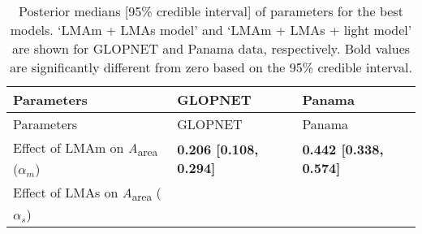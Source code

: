 \documentclass[
  12pt,
]{article}
\begin{document}
\newpage

\hypertarget{section-1}{%
\section{}\label{section-1}}

\begin{longtable}[]{@{}lll@{}}
\caption{\label{tab:paratab} Posterior medians {[}95\% credible interval{]} of parameters for the best models. `LMAm + LMAs model' and `LMAm + LMAs + light model' are shown for GLOPNET and Panama data, respectively. Bold values are significantly different from zero based on the 95\% credible interval.}\tabularnewline
\toprule
\begin{minipage}[b]{0.39\columnwidth}\raggedright
Parameters\strut
\end{minipage} & \begin{minipage}[b]{0.26\columnwidth}\raggedright
GLOPNET\strut
\end{minipage} & \begin{minipage}[b]{0.26\columnwidth}\raggedright
Panama\strut
\end{minipage}\tabularnewline
\midrule
\endfirsthead
\toprule
\begin{minipage}[b]{0.39\columnwidth}\raggedright
Parameters\strut
\end{minipage} & \begin{minipage}[b]{0.26\columnwidth}\raggedright
GLOPNET\strut
\end{minipage} & \begin{minipage}[b]{0.26\columnwidth}\raggedright
Panama\strut
\end{minipage}\tabularnewline
\midrule
\endhead
\begin{minipage}[t]{0.39\columnwidth}\raggedright
Effect of LMAm on \emph{A}\textsubscript{area} (\(\alpha_m\))\strut
\end{minipage} & \begin{minipage}[t]{0.26\columnwidth}\raggedright
\textbf{0.206 {[}0.108, 0.294{]}}\strut
\end{minipage} & \begin{minipage}[t]{0.26\columnwidth}\raggedright
\textbf{0.442 {[}0.338, 0.574{]}}\strut
\end{minipage}\tabularnewline
\begin{minipage}[t]{0.39\columnwidth}\raggedright
Effect of LMAs on \emph{A}\textsubscript{area} (\(\alpha_s\))\strut
\end{minipage} & \begin{minipage}[t]{0.26\columnwidth}\raggedright

\end{minipage}
\end{longtable}
\end{document}
